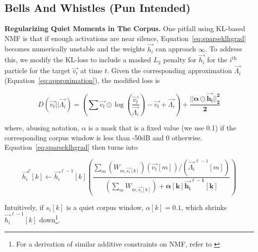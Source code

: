 \documentclass{article}
\begin{document}
\subsection{Bells And Whistles (Pun Intended)}

\textbf{Regularizing Quiet Moments in The Corpus.} One pitfall using KL-based NMF is that if enough activations are near silence, Equation~\ref{eq:sparseklhgrad} becomes numerically unstable and the weights $\vec{h_i}$ can approach $\infty$.  To address this, we modify the KL-loss to include a masked $L_2$ penalty for $\vec{h_i}$ for the $i^{\text{th}}$ particle for the target $\vec{v_t}$ at time $t$.  Given the corresponding approximation $\vec{\Lambda_i}$ (Equation~\ref{eq:approximation}), the modified loss is

\begin{equation}
    \label{eq:kllossalpha}
    D(\vec{v_t} || \vec{\Lambda_i}) = \left( \sum \vec{v_t} \odot \log \left( \frac{\vec{v_t}}{\vec{\Lambda_i}} \right) - \vec{v_t} + \vec{\Lambda_i} \right) + \boldsymbol{ \frac{||\alpha \odot \vec{h_i}||_2^2 }{2} }
    \end{equation}

where, abusing notation, $\alpha$ is a mask that is a fixed value (we use 0.1) if the corresponding corpus window is less than -50dB and $0$ otherwise.  Equation~\ref{eq:sparseklhgrad} then turns into 

\begin{equation}
    \label{eq:sparseklhgradalpha}
    \vec{h_i}^{\ell}[k]  \gets \vec{h_i}^{\ell-1}[k] \left(  \frac{\sum_m (W_{m, \vec{s_i}[k]}) (\vec{v_t}[m]) / (\vec{\Lambda_i}^{\ell-1}[m]) }{ (\sum_{m} W_{m, \vec{s_i}[k]}) + \boldsymbol{ \alpha[k] \vec{h_i}^{\ell-1}[k]}} \right)
\end{equation}

Intuitively, if $s_i[k]$ is a quiet corpus window, $\alpha[k] = 0.1$, which shrinks $\vec{h_i}^{\ell-1}[k]$ down\footnote{For a derivation of similar additive constraints on NMF, refer to \cite{virtanen2007monaural}}.


\end{document}
